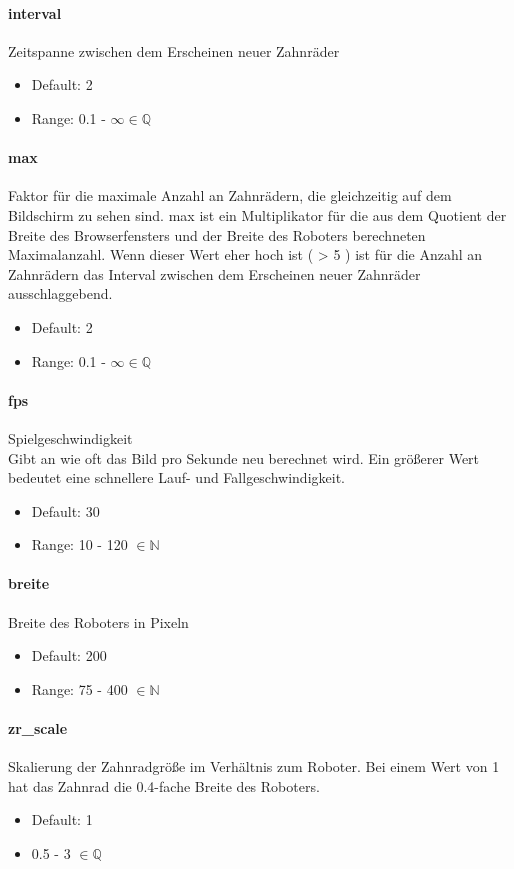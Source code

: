 \documentclass[]{article}
\begin{document}
\begin{multicols}{2}
	\paragraph{interval}  Zeitspanne zwischen dem Erscheinen neuer Zahnräder
	\begin{itemize}
		\item Default:  2
		\item Range:  0.1 - $\infty \in \mathbb{Q}$
	\end{itemize}
	\paragraph{max}  Faktor für die maximale Anzahl an Zahnrädern, die gleichzeitig auf dem Bildschirm zu sehen sind.  max ist ein Multiplikator für die aus dem Quotient der Breite des Browserfensters und der Breite des Roboters berechneten Maximalanzahl. Wenn dieser Wert eher hoch ist ( > 5 ) ist für die Anzahl an Zahnrädern das Interval zwischen dem Erscheinen neuer Zahnräder ausschlaggebend.
	\begin{itemize}
		\item Default:  2
		\item Range: 0.1 - $\infty \in \mathbb{Q}$
	\end{itemize}


	\paragraph{fps}  Spielgeschwindigkeit \\
	Gibt an wie oft das Bild pro Sekunde neu berechnet wird. Ein größerer Wert bedeutet eine schnellere Lauf- und Fallgeschwindigkeit.
	\begin{itemize}

		\item Default:  30
		\item Range: 10 - 120 $\in \mathbb{N} $

	\end{itemize}
	\paragraph{breite}  Breite des Roboters in Pixeln
	\begin{itemize}
		\item Default:  200
		\item Range: 75 - 400 $\in \mathbb{N}$
	\end{itemize}
	\paragraph{zr\_scale}  Skalierung der Zahnradgröße im Verhältnis zum Roboter. Bei einem Wert von 1 hat das Zahnrad die 0.4-fache Breite des Roboters.
	\begin{itemize}
		\item Default:  1
		\item 0.5 - 3 $\in \mathbb{Q} $
	\end{itemize}

 
	\end{multicols}
\end{document}
